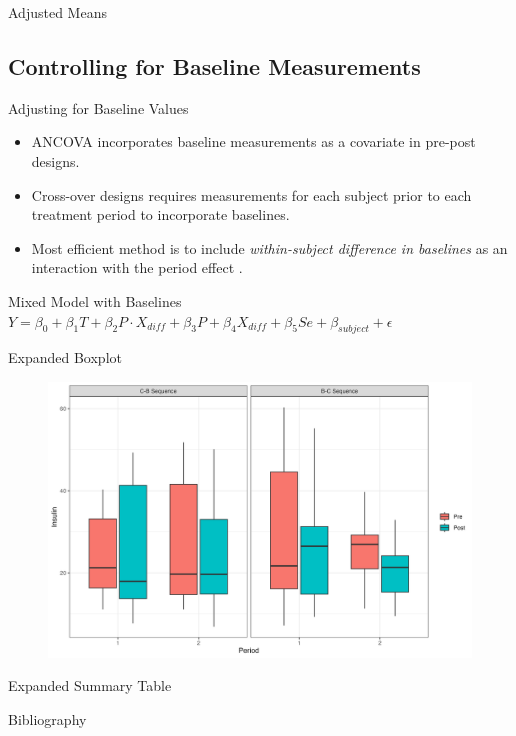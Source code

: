 \documentclass{beamer}
\begin{document}
\begin{frame}{Adjusted Means}
    
\end{frame}

\subsection{Controlling for Baseline Measurements}
\begin{frame}{Adjusting for Baseline Values}
    \begin{itemize}
        \item ANCOVA incorporates baseline measurements as a covariate in pre-post designs.
        \item Cross-over designs requires measurements for each subject prior to each treatment period to incorporate baselines.
        \item Most efficient method is to include \textit{within-subject difference in baselines} as an interaction with the period effect \cite{mehrotra2014}.
    \end{itemize}
    \begin{block}{Mixed Model with Baselines}
        $Y = \beta_0 + \beta_1 T + \beta_2 P \cdot X_{diff} + \beta_3 P + \beta_4 X_{diff} + \beta_5 Se + \beta_{subject} + \epsilon$
    \end{block}
\end{frame}

\begin{frame}{Expanded Boxplot}
    \begin{figure}
        \centering
        \includegraphics[width=\linewidth]{report/figures/ch3/proteinBoxplot.png}
    \end{figure}
\end{frame}

\begin{frame}{Expanded Summary Table}
    
\end{frame}

\begin{frame}{Bibliography}
    
    
\end{frame}
\end{document}
